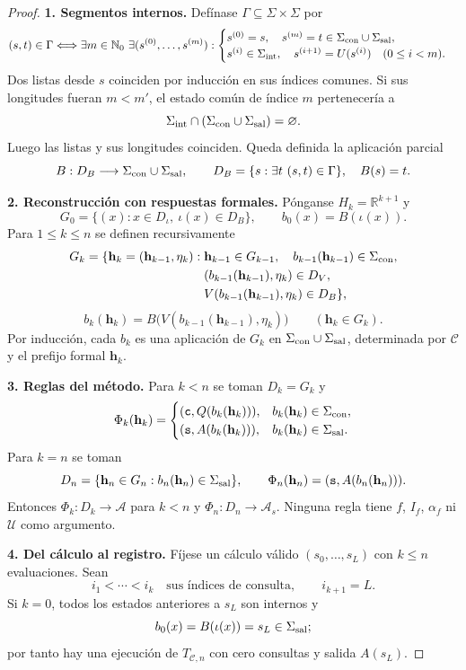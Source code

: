 \documentclass[11pt,a4paper]{article}
\numberwithin{equation}{section}
\theoremstyle{definition}
\theoremstyle{remark}
\newcommand{\R}{\mathbb R}
\newcommand{\Nn}{\mathbb N_0}
\newcommand{\hc}{\mathbf h}
\newcommand{\ct}{\mathtt c}
\newcommand{\st}{\mathtt s}
\newcommand{\paso}[1]{\par\smallskip\noindent\textbf{#1}\quad}
\begin{document}
\begin{proof}
\paso{1. Segmentos internos.}
Defínase $\Gamma\subseteq\Sigma\times\Sigma$ por
\[
(s,t)\in\Gamma\Longleftrightarrow
\exists m\in\Nn\ \exists(s^{(0)},\ldots,s^{(m)}):
\begin{cases}
s^{(0)}=s,\quad s^{(m)}=t\in\Sigma_{\rm con}\cup\Sigma_{\rm sal},\\
s^{(i)}\in\Sigma_{\rm int},\quad s^{(i+1)}=U(s^{(i)})\quad(0\le i<m).
\end{cases}
\]
Dos listas desde $s$ coinciden por inducción en sus índices comunes. Si sus longitudes fueran $m<m'$, el estado común de índice $m$ pertenecería a
\[
\Sigma_{\rm int}\cap(\Sigma_{\rm con}\cup\Sigma_{\rm sal})=\varnothing.
\]
Luego las listas y sus longitudes coinciden. Queda definida la aplicación parcial
\[
B:D_B\longrightarrow\Sigma_{\rm con}\cup\Sigma_{\rm sal},\qquad
D_B=\{s:\exists t\ (s,t)\in\Gamma\},\quad B(s)=t.
\]
\paso{2. Reconstrucción con respuestas formales.}
Pónganse $H_k=\R^{k+1}$ y
\[
G_0=\{(x):x\in D_\iota,\ \iota(x)\in D_B\},\qquad
b_0(x)=B(\iota(x)).
\]
Para $1\le k\le n$ se definen recursivamente
\begin{align*}
G_k=\{\hc_k=(\hc_{k-1},\eta_k):\;&\hc_{k-1}\in G_{k-1},\quad b_{k-1}(\hc_{k-1})\in\Sigma_{\rm con},\\
&(b_{k-1}(\hc_{k-1}),\eta_k)\in D_V,\\
&V(b_{k-1}(\hc_{k-1}),\eta_k)\in D_B\},
\end{align*}
\[
b_k(\hc_k)=B\bigl(V(b_{k-1}(\hc_{k-1}),\eta_k)\bigr)\qquad(\hc_k\in G_k).
\]
Por inducción, cada $b_k$ es una aplicación de $G_k$ en $\Sigma_{\rm con}\cup\Sigma_{\rm sal}$, determinada por $\mathscr C$ y el prefijo formal $\hc_k$.
\paso{3. Reglas del método.}
Para $k<n$ se toman $D_k=G_k$ y
\[
\Phi_k(\hc_k)=
\begin{cases}
(\ct,Q(b_k(\hc_k))),&b_k(\hc_k)\in\Sigma_{\rm con},\\
(\st,A(b_k(\hc_k))),&b_k(\hc_k)\in\Sigma_{\rm sal}.
\end{cases}
\]
Para $k=n$ se toman
\[
D_n=\{\hc_n\in G_n:b_n(\hc_n)\in\Sigma_{\rm sal}\},\qquad
\Phi_n(\hc_n)=(\st,A(b_n(\hc_n))).
\]
Entonces $\Phi_k:D_k\to\mathcal A$ para $k<n$ y $\Phi_n:D_n\to\mathcal A_s$. Ninguna regla tiene $f$, $I_f$, $\alpha_f$ ni $\mathcal U$ como argumento.
\paso{4. Del cálculo al registro.}
Fíjese un cálculo válido $(s_0,\ldots,s_L)$ con $k\le n$ evaluaciones. Sean
\[
i_1<\cdots<i_k\quad\text{sus índices de consulta},\qquad i_{k+1}=L.
\]
Si $k=0$, todos los estados anteriores a $s_L$ son internos y
\[
b_0(x)=B(\iota(x))=s_L\in\Sigma_{\rm sal};
\]
por tanto hay una ejecución de $T_{\mathscr C,n}$ con cero consultas y salida $A(s_L)$.


\end{proof}
\end{document}
